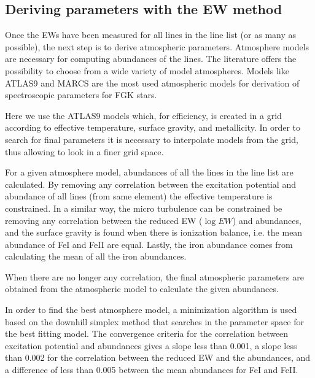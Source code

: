 \documentclass{aa}
\begin{document}
\subsection{Deriving parameters with the EW method}
\label{sec:deriving_parameters_with_the_ew_method}

Once the EWs have been measured for all lines in the line list (or as
many as possible), the next step is to derive atmospheric parameters.
Atmosphere models are necessary for computing abundances of the lines.
The literature offers the possibility to choose from a wide variety
of model atmospheres. Models like ATLAS9 \citep{Kurucz1993} and
MARCS \citep{Gustafson2008} are the most used atmospheric models for
derivation of spectroscopic parameters for FGK stars.

Here we use the ATLAS9 models which, for efficiency, is created in
a grid according to effective temperature, surface gravity, and
metallicity. In order to search for final parameters it is necessary to
interpolate models from the grid, thus allowing to look in a finer grid
space.

For a given atmosphere model, abundances of all the lines in the line
list are calculated. By removing any correlation between the excitation
potential and abundance of all lines (from same element) the effective
temperature is constrained. In a similar way, the micro turbulence can
be constrained be removing any correlation between the reduced EW ($\log
EW$) and abundances, and the surface gravity is found when there is
ionization balance, i.e. the mean abundance of FeI and FeII are equal.
Lastly, the iron abundance comes from calculating the mean of
all the iron abundances.

When there are no longer any correlation, the final atmospheric
parameters are obtained from the atmospheric model to calculate the
given abundances.

In order to find the best atmosphere model, a minimization algorithm
is used based on the downhill simplex method \citep{Press1992} that
searches in the parameter space for the best fitting model. The
convergence criteria for the correlation between excitation potential
and abundances gives a slope less than 0.001, a slope less than 0.002
for the correlation between the reduced EW and the abundances, and a
difference of less than 0.005 between the mean abundances for FeI and
FeII.
\end{document}
